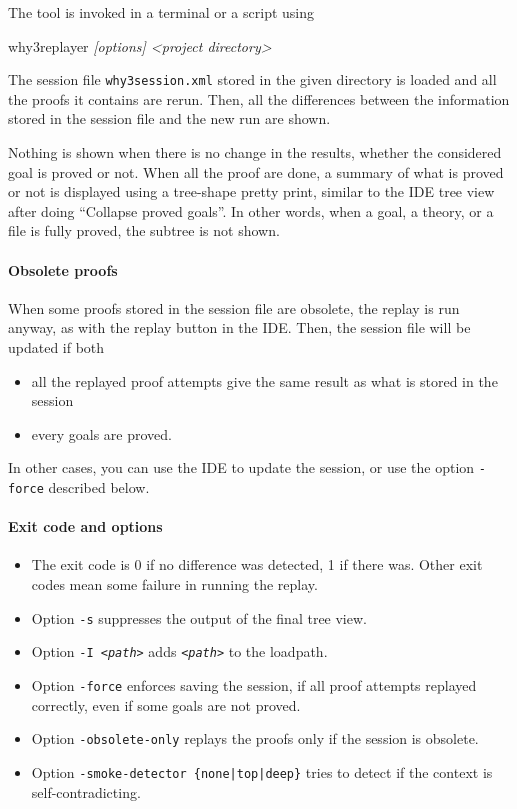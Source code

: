 The tool is invoked in a terminal or a script using
\begin{flushleft}\ttfamily
  why3replayer \textsl{[options] <project directory>}
\end{flushleft}
The session file \texttt{why3session.xml} stored in the given
directory is loaded and all the proofs it contains are rerun. Then,
all the differences between the information stored in the session file and
the new run are shown.

Nothing is shown when there is no change in the results, whether the
considered goal is proved or not. When all the proof
are done, a summary of what is proved or not is displayed using a
tree-shape pretty print, similar to the IDE tree view after doing
``Collapse proved goals''. In other words, when a goal, a theory, or a
file is fully proved, the subtree is not shown.

\paragraph{Obsolete proofs}

When some proofs stored in the session file are obsolete, the replay is
run anyway, as with the replay button in the IDE. Then, the session
file will be updated if both 
\begin{itemize}
\item all the replayed proof attempts give the same result as what
  is stored in the session
\item every goals are proved.
\end{itemize}
In other cases, you can use the IDE to update the session, or use the
option \verb|-force| described below.

\paragraph{Exit code and options}

\begin{itemize}
\item The exit code is 0 if no difference was detected, 1 if there
  was. Other exit codes mean some failure in running the replay.
\item Option \verb|-s| suppresses the output of the final tree view.
\item Option \texttt{-I \textsl{<path>}} adds \texttt{\textsl{<path>}} to the loadpath.
\item Option \verb|-force| enforces saving the session, if all proof
  attempts replayed correctly, even if some goals are not proved.
\item Option \verb|-obsolete-only| replays the proofs only if the session
  is obsolete.
\item Option \texttt{-smoke-detector \{none|top|deep\}} tries to detect
  if the context is self-contradicting.
\end{itemize}

